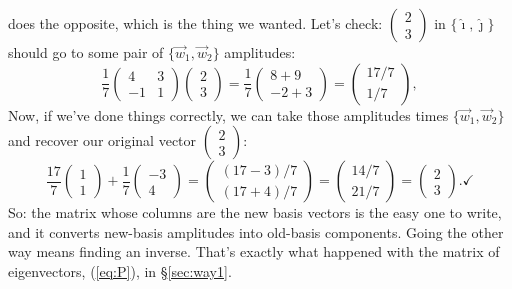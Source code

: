 \documentclass[12pt]{article}
\numberwithin{equation}{section}
\begin{document}
does the opposite, which is the thing we wanted. Let's check:
$\left(\begin{smallmatrix} 2 \\ 3 \end{smallmatrix}\right)$ in
$\{\hat{\imath}, \hat{\jmath}\}$ should go to some pair of
$\{\vec{w}_1, \vec{w}_2\}$ amplitudes:
\begin{equation*}
  \frac{1}{7}\begin{pmatrix} 4 & 3 \\ -1 & 1 \end{pmatrix}
  \begin{pmatrix} 2 \\ 3 \end{pmatrix}
  = \frac{1}{7}\begin{pmatrix} 8 + 9 \\ -2 + 3 \end{pmatrix}
  = \begin{pmatrix} 17/7 \\ 1/7 \end{pmatrix},
\end{equation*}
Now, if we've done things correctly, we can take those amplitudes times
$\{\vec{w}_1, \vec{w}_2\}$ and recover our original vector
$\left(\begin{smallmatrix} 2 \\ 3 \end{smallmatrix}\right)$:
\begin{equation*}
  \frac{17}{7}\begin{pmatrix} 1 \\ 1 \end{pmatrix}
  + \frac{1}{7}\begin{pmatrix} -3 \\ 4 \end{pmatrix}
  = \begin{pmatrix} (17 - 3)/7 \\ (17 + 4)/7 \end{pmatrix}
  = \begin{pmatrix} 14/7 \\ 21/7 \end{pmatrix}
  = \begin{pmatrix} 2 \\ 3 \end{pmatrix}. \checkmark
\end{equation*}
So: the matrix whose columns are the new basis vectors is the easy one to
write, and it converts new-basis amplitudes into old-basis components.
Going the other way means finding an inverse. That's exactly what happened with
the matrix of eigenvectors, (\ref*{eq:P}), in \S\ref{sec:way1}.
\end{document}
